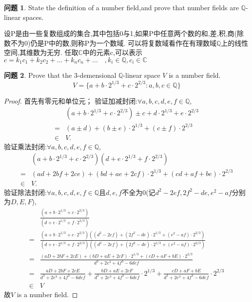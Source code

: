 \documentclass[11pt]{ctexart}
\theoremstyle{definition}
\newtheorem{qqq}{问题}[section]
\numberwithin{equation}{section}
\begin{document}
\begin{qqq}
    State the definition of a number field,and prove that number fields are $\mathbb{Q}$-linear spaces.
\end{qqq}
\begin{aaa}
    设P是由一些复数组成的集合,其中包括0与1,如果P中任意两个数的和,差,积,商(除数不为0)仍是P中的数,则称P为一个数域.
    \newline
    可以将复数域看作在有理数域$\mathbb{Q}$上的线性空间,其维数为无穷.
    任取$\mathbb{C}$中的元素c,可以表示$c=k_1c_1+k_2c_2+...+k_nc_n+...\quad ,k_i\in \mathbb{Q},c_i \in \mathbb{C}$

\end{aaa}
\begin{qqq}
    Prove that the 3-demensional $\mathbb{Q}$-linear space $V$ is a number field.
    $$ V=\{ a+b \cdot 2^{1/3} +c \cdot 2 ^ {2/3} : a,b,c \in \mathbb{Q} \}$$   
\end{qqq}
\begin{proof}
    首先有零元和单位元；
    \newline
    验证加减封闭:\qquad $\forall a,b,c,d,e,f \in \mathbb{Q}$,
    \begin{align*}
    &(a+b \cdot 2^{1/3} +c \cdot 2 ^ {2/3})\pm c+d \cdot 2^{1/3} +e \cdot 2 ^ {2/3}\\
    =&(a\pm d)+(b\pm e) \cdot 2^{1/3} +(c\pm f) \cdot 2 ^ {2/3}\\
    \in &V.
    \end{align*}
    验证乘法封闭:\qquad $\forall a,b,c,d,e,f \in \mathbb{Q}$,
    \begin{align*}
        &(a+b \cdot 2^{1/3} +c \cdot 2 ^ {2/3})(d+e \cdot 2^{1/3} +f \cdot 2 ^ {2/3})\\
        =&(ad+2bf+2ce)+(bd+ae+2cf) \cdot 2^{1/3} +(cd+af+be) \cdot 2 ^ {2/3}\\
        \in &V.
    \end{align*}
    验证除法封闭:\qquad  $\forall a,b,c,d,e,f \in \mathbb{Q}$且$d,e,f$不全为0(记$d^2-2ef,2f^2-de,e^2-af$分别为$D,E,F$),
    \begin{align*}
        &\frac{(a+b \cdot 2^{1/3} +c \cdot 2 ^ {2/3})}{(d+e \cdot 2^{1/3} +f \cdot 2 ^ {2/3})}\\
        =&\frac{(a+b \cdot 2^{1/3} +c \cdot 2 ^ {2/3})((d^2-2ef)+(2f^2-de) \cdot 2^{1/3} +(e^2-af) \cdot 2 ^ {2/3})}{(d+e \cdot 2^{1/3} +f \cdot 2 ^ {2/3})((d^2-2ef)+(2f^2-de) \cdot 2^{1/3} +(e^2-af) \cdot 2 ^ {2/3})}\\
        =&\frac{(aD+2bF+2cE)+(bD+aE+2cF) \cdot 2^{1/3} +(cD+aF+bE) \cdot 2 ^ {2/3}}{d^3+2e^3+4f^3-6def}\\
        =&\frac{aD+2bF+2cE}{d^3+2e^3+4f^3-6def}+\frac{bD+aE+2cF}{d^3+2e^3+4f^3-6def} \cdot 2^{1/3}+\frac{cD+aF+bE}{d^3+2e^3+4f^3-6def} \cdot 2 ^ {2/3}\\
        \in & V
    \end{align*}
    故$V$ is a number field.
\end{proof}
\end{document}
